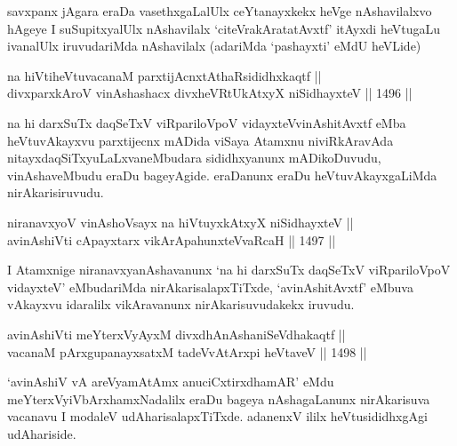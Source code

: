 \begin{artha}
savxpanx jAgara eraDa vasethxgaLalUlx ceYtanayxkekx heVge nAshavilalxvo hAgeye I suSupitxyalUlx nAshavilalx `citeVrakAratatAvxtf' itAyxdi heVtugaLu ivanalUlx iruvudariMda nAshavilalx (adariMda `pashayxti' eMdU heVLide)
\end{artha}



\begin{shl}
na hiVtiheVtuvacanaM parxtijAcnxtAthaRsididhxkaqtf || \\
divxparxkAroV vinAshashacx divxheVRtUkAtxyX niSidhayxteV \hfill || 1496 ||  
\end{shl}

\begin{artha}
na hi darxSuTx daqSeTxV viRpariloVpoV vidayxteV\s vinAshitAvxtf eMba heVtuvAkayxvu parxtijecnx mADida viSaya Atamxnu niviRkAravAda nitayxdaqSiTxyuLaLxvaneMbudara sididhxyanunx mADikoDuvudu, vinAshaveMbudu eraDu bageyAgide. eraDanunx eraDu heVtuvAkayxgaLiMda nirAkarisiruvudu.
\end{artha}


\begin{shl}
niranavxyoV vinAshoV\s sayx na hiVtuyxkAtxyX niSidhayxteV || \\
avinAshiVti cApayxtarx vikArApahunxteVvaRcaH \hfill || 1497 ||  
\end{shl}

\begin{artha}
I Atamxnige niranavxyanAshavanunx `na hi darxSuTx daqSeTxV viRpariloVpoV vidayxteV' eMbudariMda nirAkarisalapxTiTxde, `avinAshitAvxtf' eMbuva vAkayxvu idaralilx vikAravanunx nirAkarisuvudakekx iruvudu.
\end{artha}


\begin{shl}
avinAshiVti meYterxVyAyxM divxdhAnAshaniSeVdhakaqtf || \\
vacanaM pArxgupanayxsatxM tadeVvAtArxpi heVtaveV \hfill || 1498 ||  
\end{shl}

\begin{artha}
`avinAshiV vA areV\s yamAtAmx anuciCxtirxdhamAR' eMdu meYterxVyiVbArxhamxNadalilx eraDu bageya nAshagaLanunx nirAkarisuva vacanavu I modaleV udAharisalapxTiTxde. adanenxV ililx heVtusididhxgAgi udAhariside.
\end{artha}

